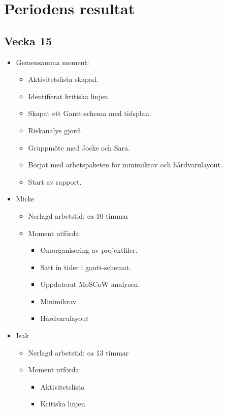 \section{Periodens resultat}
\subsection*{Vecka 15}

\begin{itemize}[noitemsep]
    \item Gemensamma moment:
    \begin{itemize}[noitemsep]
        \item Aktivitetslista skapad.
        \item Identifierat kritiska linjen.
        \item Skapat ett Gantt-schema med tidsplan.
        \item Riskanalys gjord.
        \item Gruppmöte med Jocke och Sara.
        \item Börjat med arbetspaketen för minimikrav och hårdvarulayout.
        \item Start av rapport.
    \end{itemize}
    \item Micke
    \begin{itemize}[noitemsep]
        \item Nerlagd arbetstid: ca 10 timmar
        \item Moment utförda:
        \begin{itemize}[noitemsep]
            \item Omorganisering av projektfiler.
            \item Satt in tider i gantt-schemat.
            \item Uppdaterat MoSCoW analysen.
            \item Minimikrav
            \item Hårdvarulayout
		\end{itemize}           
    \end{itemize}
    \item Isak
    \begin{itemize}[noitemsep]
        \item Nerlagd arbetstid: ca 13 timmar
        \item Moment utförda:
        \begin{itemize}[noitemsep]
            \item Aktivitetslista
            \item Kritiska linjen

\end{itemize}
\end{itemize}
\end{itemize}
